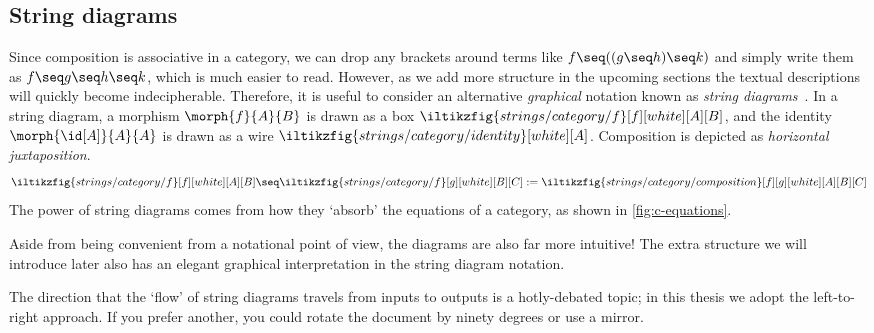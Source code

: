\subsection{String diagrams}

Since composition is associative in a category, we can drop any brackets around
terms like \(
    f \seq ((g \seq h) \seq k)
\) and simply write them as \(
    f \seq g \seq h \seq k
\), which is much easier to read.
However, as we add more structure in the upcoming sections the textual
descriptions will quickly become indecipherable.
Therefore, it is useful to consider an alternative \emph{graphical} notation
known as \emph{string diagrams}~\cite{joyal1991geometry}.
In a string diagram, a morphism \(\morph{f}{A}{B}\) is drawn as a box \(
    \iltikzfig{strings/category/f}[f][white][A][B]
\), and the identity \(\morph{\id[A]}{A}{A}\) is drawn as a wire \(
    \iltikzfig{strings/category/identity}[white][A]
\).
Composition is depicted as \emph{horizontal juxtaposition}. \[
    \iltikzfig{strings/category/f}[f][white][A][B]
    \seq
    \iltikzfig{strings/category/f}[g][white][B][C] :=
    \iltikzfig{strings/category/composition}[f][g][white][A][B][C]
\]
The power of string diagrams comes from how they `absorb' the equations of a
category, as shown in \cref{fig:c-equations}.



Aside from being convenient from a notational point of view, the diagrams are
also far more intuitive!
The extra structure we will introduce later also has an elegant graphical
interpretation in the string diagram notation.

\begin{remark}
    The direction that the `flow' of string diagrams travels from inputs to
    outputs is a hotly-debated topic; in this thesis we adopt the left-to-right
    approach.
    If you prefer another, you could rotate the document by ninety degrees or
    use a mirror.
\end{remark}